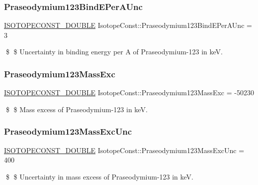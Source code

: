 \subsubsection{\texorpdfstring{Praseodymium123\+Bind\+E\+Per\+A\+Unc}{Praseodymium123BindEPerAUnc}}
{\footnotesize\ttfamily \mbox{\hyperlink{group___isotope_const-_macros_ga8f45a7272ce02c0b4c65c44636ed719a}{I\+S\+O\+T\+O\+P\+E\+C\+O\+N\+S\+T\+\_\+\+D\+O\+U\+B\+LE}} Isotope\+Const\+::\+Praseodymium123\+Bind\+E\+Per\+A\+Unc = 3}

\$ \$ Uncertainty in binding energy per A of Praseodymium-\/123 in keV. \mbox{\label{group___isotope_const-_praseodymium-_pr123_gaea23cee7ddc79ef4696f71ef557202e6}} 
\subsubsection{\texorpdfstring{Praseodymium123\+Mass\+Exc}{Praseodymium123MassExc}}
{\footnotesize\ttfamily \mbox{\hyperlink{group___isotope_const-_macros_ga8f45a7272ce02c0b4c65c44636ed719a}{I\+S\+O\+T\+O\+P\+E\+C\+O\+N\+S\+T\+\_\+\+D\+O\+U\+B\+LE}} Isotope\+Const\+::\+Praseodymium123\+Mass\+Exc = -\/50230}

\$ \$ Mass excess of Praseodymium-\/123 in keV. \mbox{\label{group___isotope_const-_praseodymium-_pr123_gaaf6ea38e2e76e07945f2179f35e953b4}} 
\subsubsection{\texorpdfstring{Praseodymium123\+Mass\+Exc\+Unc}{Praseodymium123MassExcUnc}}
{\footnotesize\ttfamily \mbox{\hyperlink{group___isotope_const-_macros_ga8f45a7272ce02c0b4c65c44636ed719a}{I\+S\+O\+T\+O\+P\+E\+C\+O\+N\+S\+T\+\_\+\+D\+O\+U\+B\+LE}} Isotope\+Const\+::\+Praseodymium123\+Mass\+Exc\+Unc = 400}

\$ \$ Uncertainty in mass excess of Praseodymium-\/123 in keV. \mbox{\label{group___isotope_const-_praseodymium-_pr123_ga7c10a8c9e243ef2e00639a878fbbbebb}} 
